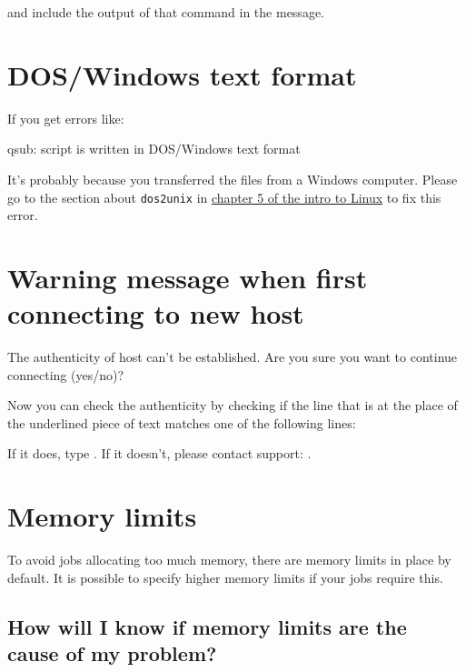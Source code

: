 and include the output of that command in the message.
\fi

\section{DOS/Windows text format}

If you get errors like:

\begin{prompt}
qsub:  script is written in DOS/Windows text format
\end{prompt}

It's probably because you transferred the files from a Windows computer.
Please go to the section about \verb|dos2unix| in \href{\LinuxManualURL#sec:dos2unix}{chapter 5 of the intro to Linux}
to fix this error.

\section{Warning message when first connecting to new host}
\label{sec:warning-message-new-host}

\ifmacORlinux
\begin{prompt}
The authenticity of host %
can't be established.
Are you sure you want to continue connecting (yes/no)?
\end{prompt}

Now you can check the authenticity by checking if the line that is at the place
of the underlined piece of text matches one of the following lines:
\begin{prompt}
\end{prompt}

If it does, type  . If it doesn't, please contact support: \hpcinfo.
\else
\firsttimeconnection
\fi

\section{Memory limits}

To avoid jobs allocating too much memory, there are memory limits in place by default.
It is possible to specify higher memory limits if your jobs require this.

\subsection{How will I know if memory limits are the cause of my problem?}

